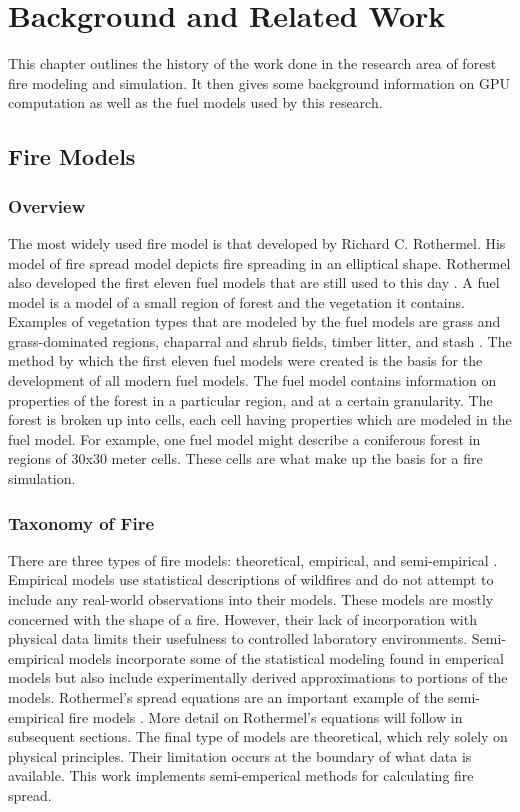 \chapter{Background and Related Work}
\label{chapter:background}
This chapter outlines the history of the work done in the research area of forest fire modeling and simulation. It then gives some background information on GPU computation as well as the fuel models used by this research.

\section{Fire Models}
\subsection{Overview}
The most widely used fire model is that developed by Richard C. Rothermel. His model of fire spread model depicts fire spreading in an elliptical shape. Rothermel also developed the first eleven fuel models that are still used to this day \cite{roth}. A fuel model is a model of a small region of forest and the vegetation it contains. Examples of vegetation types that are modeled by the fuel models are grass and grass-dominated regions, chaparral and shrub fields, timber litter, and stash \cite{1983roth}. The method by which the first eleven fuel models were created is the basis for the development of all modern fuel models. The fuel model contains information on properties of the forest in a particular region, and at a certain granularity. The forest is broken up into cells, each cell having properties which are modeled in the fuel model. For example, one fuel model might describe a coniferous forest in regions of 30x30 meter cells. These cells are what make up the basis for a fire simulation. 

\subsection{Taxonomy of Fire}
There are three types of fire models: theoretical, empirical, and semi-empirical \cite{firereview,firereview2}. Empirical models use statistical descriptions of wildfires and do not attempt to include any real-world observations into their models. These models are mostly concerned with the shape of a fire. However, their lack of incorporation with physical data limits their usefulness to controlled laboratory environments. Semi-empirical models incorporate some of the statistical modeling found in emperical models but also include experimentally derived approximations to portions of the models. Rothermel's spread equations are an important example of the semi-empirical fire models \cite{roth}. More detail on Rothermel's equations will follow in subsequent sections. The final type of models are theoretical, which rely solely on physical principles. Their limitation occurs at the boundary of what data is available. This work implements semi-emperical methods for calculating fire spread.

